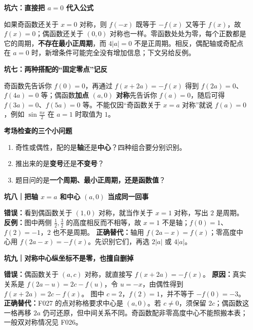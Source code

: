 \clearpage
\begin{trapbox}
\textbf{\textcolor{CTrap}{坑六：直接把 $a=0$ 代入公式}}



如果奇函数还关于 $x=0$ 对称，则 $f(-x)$ 既等于 $-f(x)$ 又等于 $f(x)$，故 $f(x)=0$；偶函数还关于 $(0,0)$ 对称也一样。零函数处处为零，每个正数都是它的周期，\textbf{不存在最小正周期}，而 $4|a|=0$ 不是正周期。相反，偶配轴或奇配点在 $a=0$ 时，新增条件可能完全没有增加信息；下文另给反例。

\medskip

\end{trapbox}
\clearpage
\begin{trapbox}
\textbf{\textcolor{CTrap}{坑七：两种搭配的“固定零点”记反}}



奇函数先告诉你 $f(0)=0$，再通过 $f(x+2a)=-f(x)$ 得到 $f(2a)=0$、$f(4a)=0$ 等；偶函数\textbf{加点 $(a,0)$ 对称}先告诉你 $f(a)=0$，随后可得 $f(3a)=0$、$f(5a)=0$ 等。不能仅因“奇函数关于 $x=a$ 对称”就说 $f(a)=0$，例如 $\sin\frac{\pi x}{2}$ 在 $a=1$ 时取值为 $1$。

\medskip
\textbf{\textcolor{CTrap}{考场检查的三个小问题}}
\begin{enumerate}[leftmargin=*,itemsep=0.15em]
 \item 奇性或偶性，配的是\textbf{轴}还是\textbf{中心}？四种组合要分别识别。
 \item 推出来的是\textbf{变号}还是\textbf{不变号}？
 \item 题目问的是\textbf{一个周期、最小正周期，还是函数值}？
\end{enumerate}
\end{trapbox}
\clearpage
\begin{trapbox}
\textbf{坑八｜把轴 $x=a$ 和中心 $(a,0)$ 当成同一回事}


\textbf{错误：}看到偶函数关于 $(1,0)$ 对称，就当作关于 $x=1$ 对称，写出 $2$ 是周期。
\textbf{反例：}图中两侧 $\tfrac12,\tfrac32$ 的高度相反而不相等，故 $x=1$ 不是轴；$f(0)=1$、$f(2)=-1$，$2$ 也不是周期。
\textbf{正确替代：}轴用 $f(2a-x)=f(x)$；零高度中心用 $f(2a-x)=-f(x)$。先识别它们，再选 $2|a|$ 或 $4|a|$。

\end{trapbox}
\clearpage
\begin{trapbox}
\textbf{坑九｜对称中心纵坐标不是零，也擅自删掉}


\textbf{错误：}偶函数关于 $(a,c)$ 对称，就直接写 $f(x+2a)=-f(x)$。
\textbf{原因：}真实关系是 $f(2a-u)=2c-f(u)$，令 $u=-x$，由偶性得到 $f(x+2a)=2c-f(x)$。
图中 $c=2$，$f(2)=1$，并不等于 $-f(0)=-3$。
\textbf{正确替代：}F027 的点对称格要求中心是 $(a,0)$。若 $c\ne0$，须保留 $2c$；偶函数这一格再移 $2a$ 仍可还原，但中间关系不同。奇函数配非零高度中心不能照搬本表；一般双对称情况见 F026。

\end{trapbox}
